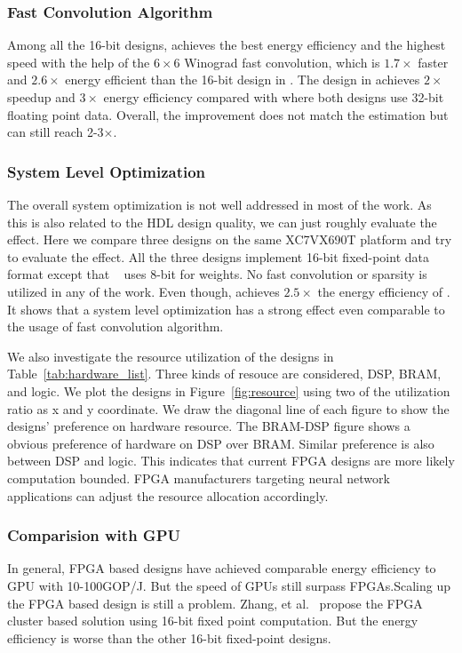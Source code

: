 \subsubsection{Fast Convolution Algorithm} Among all the 16-bit designs, \cite{lu2017evaluating} achieves the best energy efficiency and the highest speed with the help of the $6\times 6$ Winograd fast convolution, which is $1.7\times$ faster and $2.6\times$ energy efficient than the 16-bit design in \cite{zhang2017improving}. The design in \cite{zhang2017frequency} achieves $2\times$ speedup and $3\times$ energy efficiency compared with \cite{zhang2015optimizing} where both designs use 32-bit floating point data. Overall, the improvement does not match the estimation but can still reach 2-3$\times$.

\subsubsection{System Level Optimization} The overall system optimization is not well addressed in most of the work. As this is also related to the HDL design quality, we can just roughly evaluate the effect. Here we compare three designs\cite{zhang2016caffeine, liu2016automatic, li2016high} on the same XC7VX690T platform and try to evaluate the effect. All the three designs implement 16-bit fixed-point data format except that ~\cite{liu2016automatic} uses 8-bit for weights. No fast convolution or sparsity is utilized in any of the work. Even though, \cite{li2016high} achieves $2.5\times$ the energy efficiency of \cite{liu2016automatic}. It shows that a system level optimization has a strong effect even comparable to the usage of fast convolution algorithm. 

We also investigate the resource utilization of the designs in Table~\ref{tab:hardware_list}. Three kinds of resouce are considered, DSP, BRAM, and logic. We plot the designs in Figure~\ref{fig:resource} using two of the utilization ratio as x and y coordinate. We draw the diagonal line of each figure to show the designs' preference on hardware resource. The BRAM-DSP figure shows a obvious preference of hardware on DSP over BRAM. Similar preference is also between DSP and logic. This indicates that current FPGA designs are more likely computation bounded. FPGA manufacturers targeting neural network applications can adjust the resource allocation accordingly.

\subsubsection{Comparision with GPU} In general, FPGA based designs have achieved comparable energy efficiency to GPU with 10-100GOP/J. But the speed of GPUs still surpass FPGAs.Scaling up the FPGA based design is still a problem. Zhang, et al.~\cite{zhang2016energy} propose the FPGA cluster based solution using 16-bit fixed point computation. But the energy efficiency is worse than the other 16-bit fixed-point designs. 

